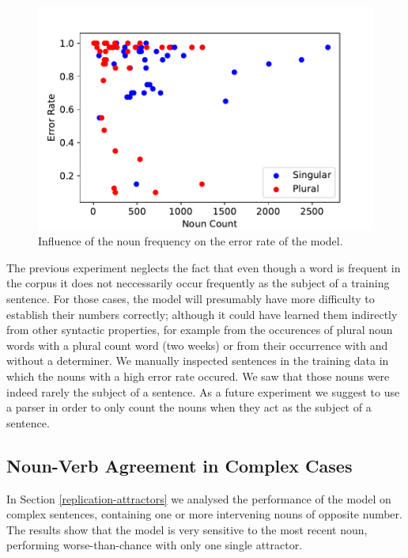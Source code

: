          \begin{figure}
          \centering
        \includegraphics[scale=0.5]{noun_freq_error_rate}
        \caption{Influence of the noun frequency on the error rate of the model.}
        \label{fig:noun_freq_error}
    \end{figure}
    
    
The previous experiment neglects the fact that even though a word is frequent in the corpus 
it does not neccessarily occur frequently as the subject of a training sentence. 
For those cases, the model will presumably 
have more difficulty to establish their numbers correctly;
although it could have learned them indirectly from other syntactic
properties, for example from the occurences of plural noun words
with a plural count word (two weeks) or from their occurrence 
with and without a determiner.
We manually inspected sentences in the training data in which
the nouns with a high error rate occured. We saw that those nouns were 
indeed rarely the subject of a sentence. As a future experiment we suggest 
to use a parser in order to only count the nouns when 
they act as the subject of a sentence. 

\subsection{Noun-Verb Agreement in Complex Cases}

In Section \ref{replication-attractors} we analysed the performance of the model
on complex sentences, containing one or more 
intervening nouns of opposite number.
The results show that the model is very
sensitive to the most recent noun,
performing worse-than-chance with only one single attractor.

